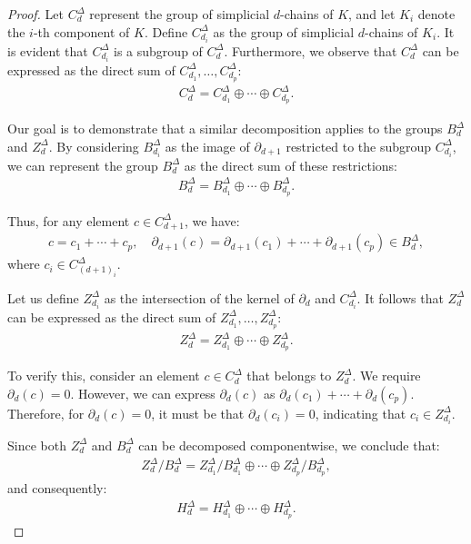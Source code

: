 \begin{proof}
	Let \( C^{\Delta}_{d} \) represent the group of simplicial \( d \)-chains of \( K \), and let \( K_{i} \) denote the \( i \)-th component of \( K \). Define \( C^{\Delta}_{d_i} \) as the group of simplicial \( d \)-chains of \( K_{i} \). It is evident that \( C^{\Delta}_{d_i} \) is a subgroup of \( C^{\Delta}_{d} \). Furthermore, we observe that \( C^{\Delta}_{d} \) can be expressed as the direct sum of \( C^{\Delta}_{d_1}, \ldots, C^{\Delta}_{d_p} \):
	\begin{align}
		C^{\Delta}_{d} = C^{\Delta}_{d_1} \oplus \cdots \oplus C^{\Delta}_{d_p}. 
	\end{align}
				
	Our goal is to demonstrate that a similar decomposition applies to the groups \( B^{\Delta}_{d} \) and \( Z^{\Delta}_{d} \). By considering \( B^{\Delta}_{d_i} \) as the image of \( \partial_{d+1} \) restricted to the subgroup \( C^{\Delta}_{d_i} \), we can represent the group \( B^{\Delta}_{d} \) as the direct sum of these restrictions:
	\begin{align}
		B^{\Delta}_{d} = B^{\Delta}_{d_1} \oplus \cdots \oplus B^{\Delta}_{d_p}. 
	\end{align}
				
	Thus, for any element \( c \in C^{\Delta}_{d+1} \), we have:
	\begin{align}
		c = c_{1} + \cdots + c_{p}, \quad \partial_{d+1}(c) = \partial_{d+1}(c_{1}) + \cdots + \partial_{d+1}(c_{p}) \in B^{\Delta}_{d}, 
	\end{align}
	where \( c_{i} \in C^{\Delta}_{(d+1)_i} \).
				
	Let us define \( Z^{\Delta}_{d_i} \) as the intersection of the kernel of \( \partial_{d} \) and \( C^{\Delta}_{d_i} \). It follows that \( Z^{\Delta}_{d} \) can be expressed as the direct sum of \( Z^{\Delta}_{d_1}, \ldots, Z^{\Delta}_{d_p} \):
	\begin{align}
		Z^{\Delta}_{d} = Z^{\Delta}_{d_1} \oplus \cdots \oplus Z^{\Delta}_{d_p}. 
	\end{align}
				
	To verify this, consider an element \( c \in C^{\Delta}_{d} \) that belongs to \( Z^{\Delta}_{d} \). We require \( \partial_{d}(c) = 0 \). However, we can express \( \partial_{d}(c) \) as \( \partial_{d}(c_{1}) + \cdots + \partial_{d}(c_{p}) \). Therefore, for \( \partial_{d}(c) = 0 \), it must be that \( \partial_{d}(c_{i}) = 0 \), indicating that \( c_{i} \in Z^{\Delta}_{d_i} \).
				
	Since both \( Z^{\Delta}_{d} \) and \( B^{\Delta}_{d} \) can be decomposed componentwise, we conclude that:
	\begin{align}
		Z^{\Delta}_{d} / B^{\Delta}_{d} = Z^{\Delta}_{d_1} / B^{\Delta}_{d_1} \oplus \cdots \oplus Z^{\Delta}_{d_p} / B^{\Delta}_{d_p}, 
	\end{align}
	and consequently:
	\begin{align}
		H^{\Delta}_{d} = H^{\Delta}_{d_1} \oplus \cdots \oplus H^{\Delta}_{d_p}. 
	\end{align}
\end{proof}

